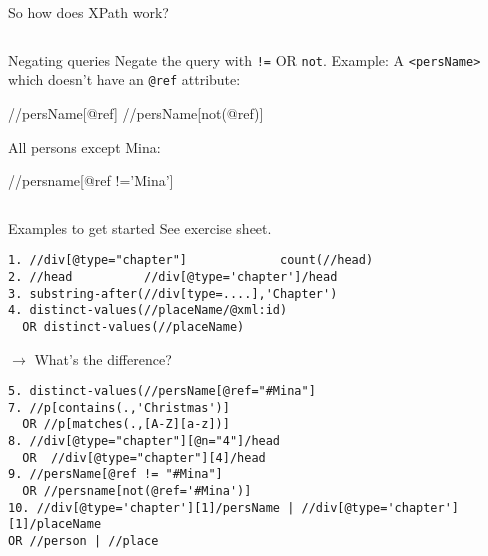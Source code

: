 \begin{frame}{So how does XPath work?}
\begin{columns}
\begin{block}{Negating queries}\footnotesize
Negate the query with \texttt{!=} OR \texttt{not}. Example:
A \texttt{<persName>} which doesn't have an \texttt{@ref} attribute: 
\begin{xmlcode}
//persName[@ref]
//persName[not(@ref)] 
\end{xmlcode}

All persons except Mina:
\begin{xmlcode}
//persname[@ref !='Mina'] 
\end{xmlcode}
\end{block}
\end{columns}

\end{frame}


\begin{frame}[fragile]{Examples to get started}
See exercise sheet. 

\scriptsize
\begin{verbatim}
1. //div[@type="chapter"]             count(//head)
2. //head          //div[@type='chapter']/head
3. substring-after(//div[type=....],'Chapter')
4. distinct-values(//placeName/@xml:id)  
  OR distinct-values(//placeName) 
\end{verbatim}
$\to$ What's the difference?
\begin{verbatim}
5. distinct-values(//persName[@ref="#Mina"]
7. //p[contains(.,'Christmas')]  
  OR //p[matches(.,[A-Z][a-z])]
8. //div[@type="chapter"][@n="4"]/head  
  OR  //div[@type="chapter"][4]/head
9. //persName[@ref != "#Mina"]  
  OR //persname[not(@ref='#Mina')] 
10. //div[@type='chapter'][1]/persName | //div[@type='chapter'][1]/placeName 
OR //person | //place
\end{verbatim}

\end{frame}

